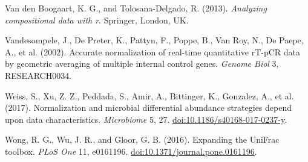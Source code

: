 \documentclass[twocolumn]{article}
\begin{document}
Van den Boogaart, K. G., and Tolosana-Delgado, R. (2013).
\emph{Analyzing compositional data with r}. Springer, London, UK.

Vandesompele, J., De Preter, K., Pattyn, F., Poppe, B., Van Roy, N., De
Paepe, A., et al. (2002). Accurate normalization of real-time
quantitative rT-pCR data by geometric averaging of multiple internal
control genes. \emph{Genome Biol} 3, RESEARCH0034.

Weiss, S., Xu, Z. Z., Peddada, S., Amir, A., Bittinger, K., Gonzalez,
A., et al. (2017). Normalization and microbial differential abundance
strategies depend upon data characteristics. \emph{Microbiome} 5, 27.
\href{http://doi.org/10.1186/s40168-017-0237-y}{doi:10.1186/s40168-017-0237-y}.

Wong, R. G., Wu, J. R., and Gloor, G. B. (2016). Expanding the UniFrac
toolbox. \emph{PLoS One} 11, e0161196.
\href{http://doi.org/10.1371/journal.pone.0161196}{doi:10.1371/journal.pone.0161196}.
\end{document}
